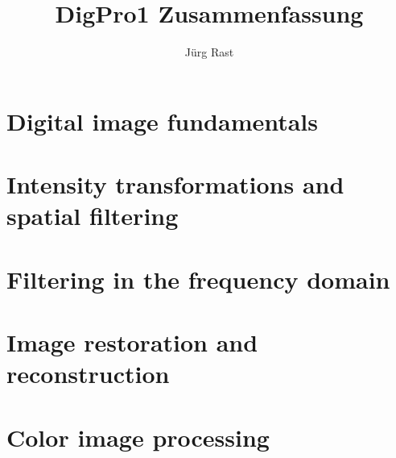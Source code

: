 \documentclass{scrartcl}
\title{DigPro1 Zusammenfassung}
\author{Jürg Rast}
\begin{document}
\section{Digital image fundamentals}

\section{Intensity transformations and spatial filtering}

\section{Filtering in the frequency domain}

\section{Image restoration and reconstruction}

\section{Color image processing}
\end{document}
